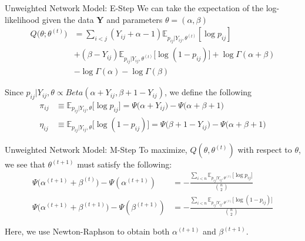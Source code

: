 \documentclass[handout]{beamer}
\begin{document}
\begin{frame}{Unweighted Network Model: E-Step}
We can take the expectation of the log-likelihood given the data \textbf{Y} and parameters $\theta = (\alpha, \beta)$
\begin{align*}
Q\big(\theta; \theta^{(t)}\big) &= \sum_{i<j} (Y_{ij} + \alpha - 1) \mathbb{E}_{p_{ij} | Y_{ij}, \theta^{(t)}} [\log  p_{ij}] \\
&+ (\beta -Y_{ij}) \mathbb{E}_{p_{ij} | Y_{ij}, \theta^{(t)}} \big[\log (1-p_{ij})\big] + \log \Gamma(\alpha + \beta) \\
&- \log \Gamma(\alpha) - \log \Gamma(\beta) 
\end{align*}

Since $p_{ij}|Y_{ij}, \theta \propto Beta(\alpha + Y_{ij}, \beta + 1 - Y_{ij})$, we define the following 
\begin{align*}
\pi_{ij} &\equiv \mathbb{E}_{p_{ij} | Y_{ij}, \theta} \big[\log p_{ij}\big] = \Psi\Big(\alpha + Y_{ij}\Big) - \Psi\Big(\alpha + \beta + 1\Big) \\
\eta_{ij} &\equiv \mathbb{E}_{p_{ij} | Y_{ij}, \theta} \big[\log (1 - p_{ij})\big] = \Psi\Big(\beta + 1 - Y_{ij}\Big) - \Psi\Big(\alpha + \beta + 1\Big)
\end{align*}
\end{frame}

\begin{frame}{Unweighted Network Model: M-Step}
To maximize, $Q(\theta, \theta^{(t)})$ with respect to $\theta$, we see that $\theta^{(t+1)}$ must satisfy the following:
\begin{align*}
\Psi\Big(\alpha^{(t+1)} + \beta^{(t)}\Big) - \Psi(\alpha^{(t+1)}) &= -\frac{\sum_{i<n}\mathbb{E}_{p_{ij} | Y_{ij}, \theta^{(t)}} \big[\log p_{ij}\big]}{{n \choose 2}} \tag{$\alpha_U$}\\
\Psi\Big(\alpha^{(t+1)} + \beta^{(t+1)}\Big) - \Psi(\beta^{(t+1)}) &= -\frac{\sum_{i<n}\mathbb{E}_{p_{ij} | Y_{ij}, \theta^{(t)}} \big[\log (1 - p_{ij})\big]}{{n \choose 2}} \tag{$\beta_U$}
\end{align*}

Here, we use Newton-Raphson to obtain both $\alpha^{(t+1)}$ and $\beta^{(t+1)}$.
\end{frame}
\end{document}
